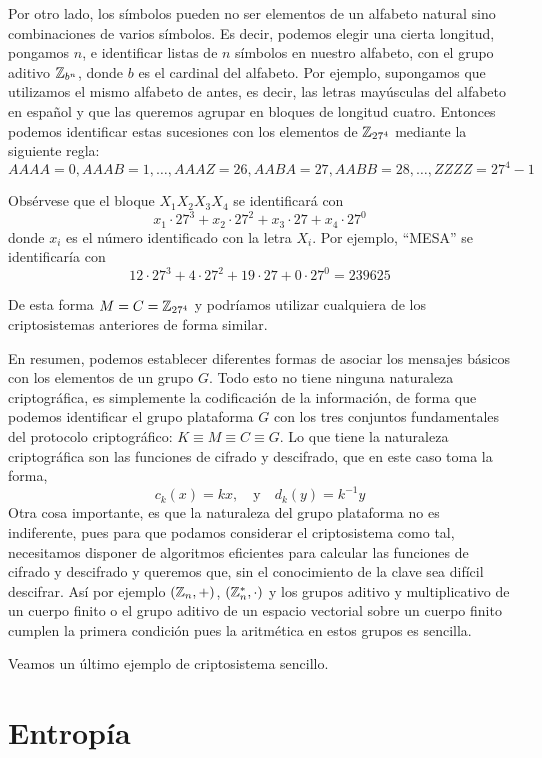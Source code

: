 Por otro lado, los símbolos pueden no ser elementos de un alfabeto natural sino combinaciones de varios símbolos. Es decir, podemos elegir una cierta longitud, pongamos $n$, e identificar listas de $n$ símbolos en nuestro alfabeto, con el grupo aditivo $\mathbb{Z}_{b^n}$, donde $b$ es el cardinal del alfabeto. Por ejemplo, supongamos que utilizamos el mismo alfabeto de antes, es decir, las letras mayúsculas del alfabeto en español y que las queremos agrupar en bloques de longitud cuatro. Entonces podemos identificar estas sucesiones con los elementos de $\mathbb{Z}_{27^4}$ mediante la siguiente regla:
$$AAAA=0, AAAB=1, \dots, AAAZ=26,AABA=27,AABB=28,\dots,ZZZZ=27^4-1$$

Obsérvese que el bloque $X_1X_2X_3X_4$ se identificará con 
$$x_1\cdot 27^3+x_2\cdot 27^2+x_3\cdot 27+x_4\cdot 27^0$$
donde $x_i$ es el número identificado con la letra $X_i$. Por ejemplo, ``MESA'' se identificaría con
$$12\cdot 27^3+4\cdot 27^2+19\cdot 27+0\cdot 27^0=239625$$

De esta forma $M=C=\mathbb{Z}_{27^4}$ y podríamos utilizar cualquiera de los criptosistemas anteriores de forma similar.

En resumen, podemos establecer diferentes formas de asociar los mensajes básicos con los elementos de un grupo $G$. Todo esto no tiene ninguna naturaleza criptográfica, es simplemente la codificación de la información, de forma que podemos identificar el grupo plataforma $G$ con los tres conjuntos fundamentales del protocolo criptográfico: $K\equiv M\equiv C\equiv G$. Lo que tiene la naturaleza criptográfica son las funciones de cifrado y descifrado, que en este caso toma la forma,
$$c_k(x)=kx, \quad\text{y}\quad d_k(y)=k^{-1}y$$
Otra cosa importante, es que la naturaleza del grupo plataforma no es indiferente, pues para que podamos considerar el criptosistema como tal, necesitamos disponer de algoritmos eficientes para calcular las funciones de cifrado y descifrado y queremos que, sin el conocimiento de la clave sea difícil descifrar. Así por ejemplo $(\mathbb{Z}_n,+)$, $(\mathbb{Z}^*_n,\cdot)$ y los grupos aditivo y multiplicativo de un cuerpo finito o el grupo aditivo de un espacio vectorial sobre un cuerpo finito cumplen la primera condición pues la aritmética en estos grupos es sencilla.

Veamos un último ejemplo de criptosistema sencillo.


\section{Entropía}

